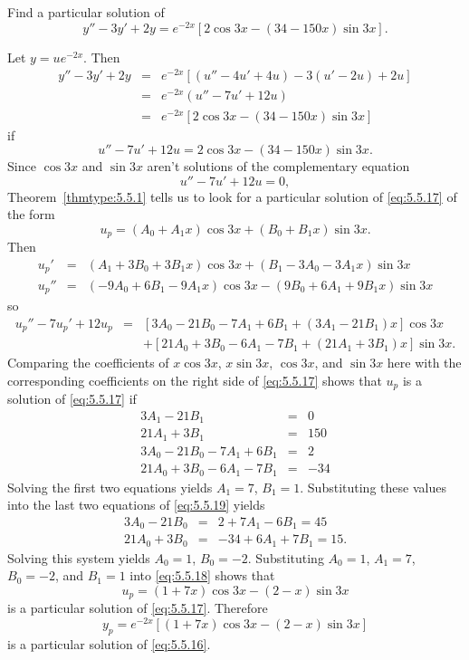 \documentclass{ximera}
\begin{document}
\begin{example}\label{example:5.5.5}
Find a particular solution of
\begin{equation} \label{eq:5.5.16}
y''-3y'+2y=e^{-2x}\left[2\cos 3x-(34-150x)\sin 3x\right].
\end{equation}
 
 
\begin{explanation}
Let $y=ue^{-2x}$. Then
\begin{eqnarray*}
y''-3y'+2y&=&e^{-2x}\left[(u''-4u'+4u)-3(u'-2u)+2u\right]\\
&=&e^{-2x}(u''-7u'+12u)\\ &=&
e^{-2x}\left[2\cos 3x-(34-150x)\sin 3x\right]
\end{eqnarray*}
if
 \begin{equation} \label{eq:5.5.17}
u''-7u'+12u=2\cos 3x-(34-150x)\sin 3x.
\end{equation}
Since $\cos3x$ and $\sin3x$ aren't solutions of
the complementary equation
$$
u''-7u'+12u=0,
$$
 Theorem~\ref{thmtype:5.5.1} tells us to look for a particular solution
of \eqref{eq:5.5.17} of the form
\begin{equation} \label{eq:5.5.18}
u_p=(A_0+A_1x)\cos 3x +(B_0+B_1x)\sin 3x.
\end{equation}
Then
\begin{eqnarray*}
u_p'&=&(A_1+3B_0+3B_1x)\cos 3x+(B_1-3A_0-3A_1x)\sin 3x\\
u_p''&=&(-9A_0+6B_1-9A_1x)\cos 3x-(9B_0+6A_1+9B_1x)\sin 3x
\end{eqnarray*}
so
\begin{eqnarray*}
u_p''-7u_p'+12u_p&=&\left[3A_0-21B_0-7A_1+6B_1+(3A_1-21B_1)x\right]\cos
3x\\ &&+\left[21A_0+3B_0-6A_1-7B_1+(21A_1+3B_1)x\right]\sin 3x.
\end{eqnarray*}
Comparing the coefficients of $x\cos 3x$, $x\sin 3x$, $\cos 3x$, and
$\sin 3x$ here with the corresponding coefficients on the right side
of \eqref{eq:5.5.17} shows that $u_p$ is a solution of \eqref{eq:5.5.17} if
\begin{equation} \label{eq:5.5.19}
\begin{array}{rcr}
3A_1-21B_1&=&0\\
21A_1+3B_1&=&150\\
3A_0-21B_0-7A_1+6B_1&=&2\\
21A_0+3B_0-6A_1-7B_1&=&-34
\end{array}
\end{equation}
Solving the first two equations yields $A_1=7$, $B_1=1$.
Substituting these values into the last two equations of \eqref{eq:5.5.19}
yields
\begin{eqnarray*}
3A_0-21B_0&=&2+7A_1-6B_1=45\\
21A_0+3B_0&=&-34+6A_1+7B_1=15.
\end{eqnarray*}
Solving this system  yields  $A_0=1$, $B_0=-2$.
Substituting $A_0=1$, $A_1=7$, $B_0=-2$, and $B_1=1$ into
\eqref{eq:5.5.18} shows that
$$
u_p=(1+7x)\cos 3x-(2-x)\sin 3x
$$
is a particular solution of  \eqref{eq:5.5.17}. Therefore
$$
y_p=e^{-2x}\left[(1+7x)\cos 3x-(2-x)\sin 3x\right]
$$
is a particular solution of   \eqref{eq:5.5.16}.
\end{explanation}
\end{example}
 
\end{document}
